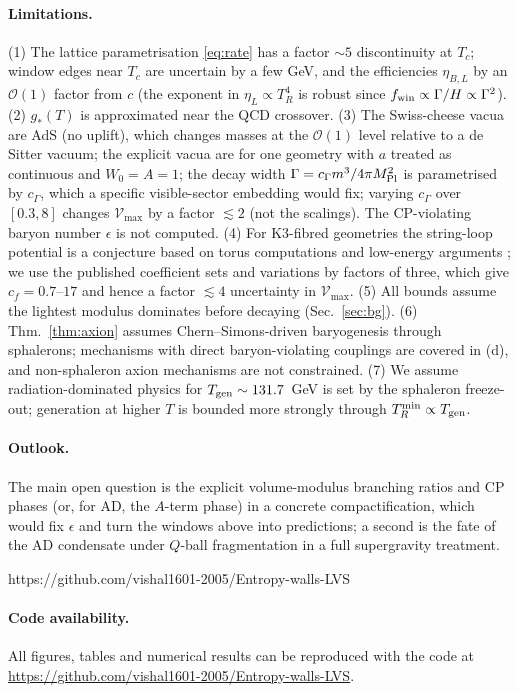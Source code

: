 \documentclass[11pt]{article}
\newcommand{\MP}{M_{\rm Pl}}
\def\codeurl{https://github.com/vishal1601-2005/Entropy-walls-LVS}
\begin{document}
\paragraph{Limitations.} (1) The lattice parametrisation \eqref{eq:rate} has a factor $\sim5$ discontinuity at $T_c$; window edges near $T_c$ are uncertain by a few GeV, and the efficiencies $\eta_{B,L}$ by an $\mathcal O(1)$ factor from $c$ (the exponent in $\eta_L\propto T_R^4$ is robust since $f_{\rm win}\propto\Gamma/H\propto\Gamma^2$). (2) $g_*(T)$ is approximated near the QCD crossover. (3) The Swiss-cheese vacua are AdS (no uplift), which changes masses at the $\mathcal O(1)$ level relative to a de Sitter vacuum; the explicit vacua are for one geometry with $a$ treated as continuous and $W_0=A=1$; the decay width $\Gamma=c_\Gamma m^3/4\pi\MP^2$ is parametrised by $c_\Gamma$, which a specific visible-sector embedding would fix; varying $c_\Gamma$ over $[0.3,8]$ changes $\mathcal V_{\max}$ by a factor $\lesssim2$ (not the scalings). The CP-violating baryon number $\epsilon$ is not computed. (4) For K3-fibred geometries the string-loop potential is a conjecture based on torus computations and low-energy arguments \cite{Cicoli:2008}; we use the published coefficient sets and variations by factors of three, which give $c_f=0.7$--$17$ and hence a factor $\lesssim4$ uncertainty in $\mathcal V_{\max}$. (5) All bounds assume the lightest modulus dominates before decaying (Sec.~\ref{sec:bg}). (6) Thm.~\ref{thm:axion} assumes Chern--Simons-driven baryogenesis through sphalerons; mechanisms with direct baryon-violating couplings are covered in (d), and non-sphaleron axion mechanisms are not constrained. (7) We assume radiation-dominated physics for $T_{\rm gen}\sim131.7$~GeV is set by the sphaleron freeze-out; generation at higher $T$ is bounded more strongly through $T_R^{\min}\propto T_{\rm gen}$.

\paragraph{Outlook.} The main open question is the explicit volume-modulus branching ratios and CP phases (or, for AD, the $A$-term phase) in a concrete compactification, which would fix $\epsilon$ and turn the windows above into predictions; a second is the fate of the AD condensate under $Q$-ball fragmentation in a full supergravity treatment.

\ifx\codeurl\empty\else\paragraph{Code availability.} All figures, tables and numerical results can be reproduced with the code at \url{\codeurl}.\fi
\end{document}
